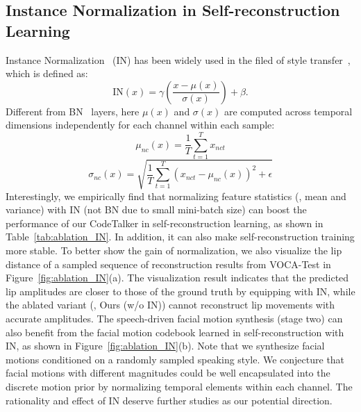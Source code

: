 \subsection{Instance Normalization in Self-reconstruction Learning}
Instance Normalization~\cite{ulyanov2016instance} (IN) has been widely used in the filed of style transfer~\cite{ulyanov2017improved,huang2017arbitrary}, which is defined as:
\begin{equation}
    \text{IN}(x) = \gamma (\frac{x-\mu(x)}{\sigma(x)})+\beta.
\end{equation}
Different from BN~\cite{ioffe2015batch} layers, here $\mu(x)$ and $\sigma(x)$ are computed across temporal dimensions independently for each channel within each sample:
\begin{equation}
    \mu_{nc}(x) = \frac{1}{T}\sum_{t=1}^{T}x_{nct}
\end{equation}
\begin{equation}
    \sigma_{nc}(x) = \sqrt{\frac{1}{T}\sum_{t=1}^{T}(x_{nct}-\mu_{nc}(x))^2+\epsilon}
\end{equation}
Interestingly, we empirically find that normalizing feature statistics (\ie, mean and variance) with IN (not BN due to small mini-batch size) can boost the performance of our CodeTalker in self-reconstruction learning, as shown in Table~\ref{tab:ablation_IN}. In addition, it can also make self-reconstruction training more stable. To better show the gain of normalization, we also visualize the lip distance of a sampled sequence of reconstruction results from VOCA-Test in Figure~\ref{fig:ablation_IN}(a). The visualization result indicates that the predicted lip amplitudes are closer to those of the ground truth by equipping with IN, while the ablated variant (\ie, Ours (w/o IN)) cannot reconstruct lip movements with accurate amplitudes. The speech-driven facial motion synthesis (stage two) can also benefit from the facial motion codebook learned in self-reconstruction with IN, as shown in Figure~\ref{fig:ablation_IN}(b). Note that we synthesize facial motions conditioned on a randomly sampled speaking style. We conjecture that facial motions with different magnitudes could be well encapsulated into the discrete motion prior by normalizing temporal elements within each channel. The rationality and effect of IN deserve further studies as our potential direction.











